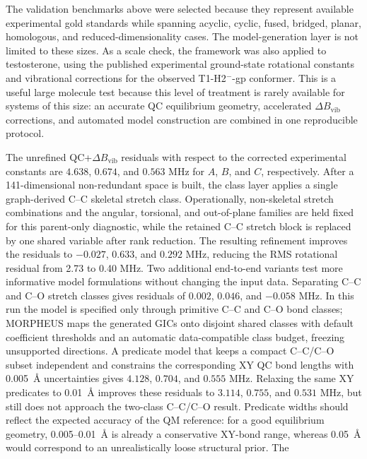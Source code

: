 \documentclass[aip,jcp,reprint,longbibliography,floatfix]{revtex4-2}
\begin{document}
The validation benchmarks above were selected because they represent available
experimental gold standards while spanning acyclic, cyclic, fused, bridged,
planar, homologous, and reduced-dimensionality cases. The model-generation
layer is not limited to these sizes. As a scale check, the framework was
also applied to testosterone, using the published experimental ground-state
rotational constants and vibrational corrections for the observed
T1-H2$^{-}$-gp conformer.\cite{Uribe2024SteroidHormones} This is a useful large
molecule test because this level of treatment is rarely available for systems
of this size: an accurate QC equilibrium geometry, accelerated
$\Delta B_\mathrm{vib}$ corrections, and automated model construction are
combined in one reproducible protocol.

The unrefined QC+$\Delta B_\mathrm{vib}$ residuals with respect to the corrected
experimental constants are $4.638$, $0.674$, and $0.563$ MHz for $A$, $B$, and
$C$, respectively. After a 141-dimensional non-redundant space is built, the
class layer applies a single graph-derived C--C skeletal stretch class.
Operationally, non-skeletal stretch combinations and the angular, torsional,
and out-of-plane families are held fixed for this parent-only diagnostic, while
the retained C--C stretch block is replaced by one shared variable after rank
reduction. The resulting refinement improves the residuals to $-0.027$,
$0.633$, and $0.292$ MHz, reducing the RMS rotational residual from 2.73 to
0.40 MHz. Two additional end-to-end variants test more informative model
formulations without changing the input data. Separating C--C and C--O stretch
classes gives residuals of $0.002$, $0.046$, and $-0.058$ MHz. In this run the
model is specified only through primitive C--C and C--O bond classes; MORPHEUS
maps the generated GICs onto disjoint shared classes with default coefficient
thresholds and an automatic data-compatible class budget, freezing unsupported
directions.
A predicate model that keeps a compact C--C/C--O subset independent and
constrains the corresponding XY QC bond lengths with 0.005~\AA{} uncertainties
gives $4.128$, $0.704$, and $0.555$ MHz. Relaxing the same XY predicates to
0.01~\AA{} improves these residuals to $3.114$, $0.755$, and $0.531$ MHz, but
still does not approach the two-class C--C/C--O result. Predicate widths should
reflect the expected accuracy of the QM reference: for a good equilibrium
geometry, 0.005--0.01~\AA{} is already a conservative XY-bond range, whereas
0.05~\AA{} would correspond to an unrealistically loose structural prior. The
\end{document}
